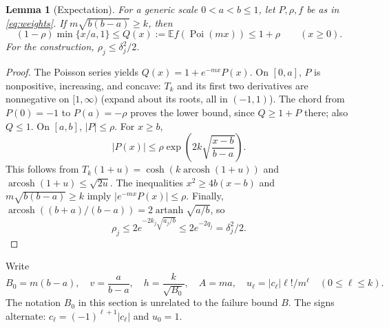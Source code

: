 \documentclass[10pt]{article}
\newtheorem{lemma}{Lemma}
\newcommand{\E}{\mathbb E}
\newcommand{\Poi}{\operatorname{Poi}}
\DeclareMathOperator{\arcosh}{arcosh}
\DeclareMathOperator{\artanh}{artanh}
\begin{document}
\begin{lemma}[Expectation]\label{lem:expect}
For a generic scale $0<a<b\le1$, let $P,\rho,f$ be as in
\eqref{eq:weights}. If $m\sqrt{b(b-a)}\ge k$, then
\[
 (1-\rho)\min\{x/a,1\}\le Q(x):=\E f(\Poi(mx))\le1+\rho
 \qquad(x\ge0).
\]
For the construction, $\rho_j\le\delta_j^2/2$.
\end{lemma}
\begin{proof}
The Poisson series yields $Q(x)=1+e^{-mx}P(x)$. On $[0,a]$, $P$ is
nonpositive, increasing, and concave: $T_k$ and its first two derivatives
are nonnegative on $[1,\infty)$ (expand about its roots, all in $(-1,1)$).
The chord from $P(0)=-1$ to $P(a)=-\rho$ proves the lower bound, since
$Q\ge1+P$ there; also $Q\le1$.
On $[a,b]$, $|P|\le\rho$. For $x\ge b$,
\[
 |P(x)|\le\rho\exp\left(2k\sqrt{\frac{x-b}{b-a}}\right).
\]
This follows from $T_k(1+u)=\cosh(k\arcosh(1+u))$ and
$\arcosh(1+u)\le\sqrt{2u}$. The inequalities
$x^2\ge4b(x-b)$ and $m\sqrt{b(b-a)}\ge k$ imply
$|e^{-mx}P(x)|\le\rho$.
Finally, $\arcosh((b+a)/(b-a))=2\artanh\sqrt{a/b}$, so
\[
 \rho_j\le2e^{-2k_j\sqrt{a_j/b}}\le2e^{-2q_j}
 =\delta_j^2/2.
\]
\end{proof}

Write
\[
 B_0=m(b-a),\quad v=\frac{a}{b-a},\quad h=\frac{k}{\sqrt{B_0}},
 \quad A=ma,\quad
 u_\ell=|c_\ell|\ell!/m^\ell\quad(0\le\ell\le k).
\]
The notation $B_0$ in this section is unrelated to the failure bound $B$.
The signs alternate: $c_\ell=(-1)^{\ell+1}|c_\ell|$ and $u_0=1$.
\end{document}
